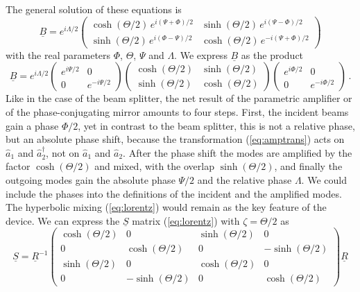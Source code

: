 \documentclass[12pt,amsmath,amssymb]{article}
\numberwithin{equation}{section}
\begin{document}
The general solution of these equations is
\begin{equation}
\underline{B} = e^{i\Lambda/2}\left(
    \begin{array}{cc}
      \cosh(\Theta/2)\,e^{i(\Psi+\Phi)/2} &
      \sinh(\Theta/2)\,e^{i(\Psi-\Phi)/2}  \\
      \sinh(\Theta/2)\,e^{i(\Phi-\Psi)/2}  &
      \cosh(\Theta/2)\,e^{-i(\Psi+\Phi)/2}
    \end{array}
\right)
\end{equation}
with the real parameters $\Phi$, $\Theta$, $\Psi$ and $\Lambda$.
We express $\underline{B}$ as the product
\begin{equation}
\label{eq:u11} \underline{B} = e^{i\Lambda/2} \left(
    \begin{array}{cc}
      e^{i\Psi/2} & 0 \\
      0 & e^{-i\Psi/2}
    \end{array}\right) \left(
    \begin{array}{cc}
      \cosh(\Theta/2) & \sinh(\Theta/2) \\
      \sinh(\Theta/2) & \cosh(\Theta/2)
    \end{array}
\right)\left(
    \begin{array}{cc}
      e^{i\Phi/2} & 0 \\
      0 & e^{-i\Phi/2}
    \end{array}\right)\,.
\end{equation}
Like in the case of the beam splitter, the net result of the
parametric amplifier or of the phase-conjugating mirror amounts
to four steps. First, the incident beams gain a phase $\Phi/2$,
yet in contrast to the beam splitter, this is not a relative
phase, but an absolute phase shift, because the transformation
(\ref{eq:amptrans}) acts on $\hat{a}_1$ and $\hat{a}_2^\dagger$,
not on $\hat{a}_1$ and $\hat{a}_2$. After the phase shift the
modes are amplified by the factor $\cosh(\Theta/2)$ and mixed,
with the overlap $\sinh(\Theta/2)$, and finally the outgoing modes
gain the absolute phase $\Psi/2$ and the relative phase
$\Lambda$. We could include the phases into the definitions of
the incident and the amplified modes. The hyperbolic mixing
(\ref{eq:lorentz}) would remain as the key feature of the device.
We can express the $\underline{S}$ matrix (\ref{eq:lorentz}) with
$\zeta=\Theta/2$ as
\begin{equation}
\label{eq:factors}
\underline{S} = \underline{R}^{-1}
    \left(
    \begin{array}{cccc}
      \cosh(\Theta/2)&0&\sinh(\Theta/2)&0\\
      0&\cosh(\Theta/2)&0&-\sinh(\Theta/2)\\
      \sinh(\Theta/2)&0&\cosh(\Theta/2)&0\\
      0&-\sinh(\Theta/2)&0&\cosh(\Theta/2)
    \end{array}
\right) \underline{R}
\end{equation}
\end{document}

